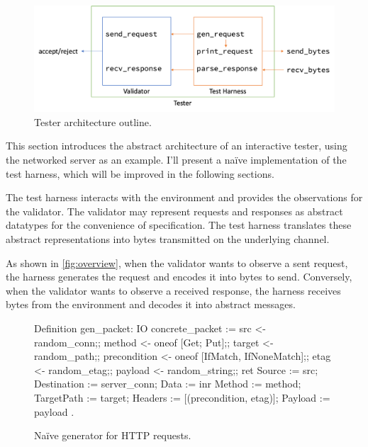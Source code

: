 \begin{figure}
  \centering
  \includegraphics[width=.9\textwidth]{figures/harness-outline}
  \caption{Tester architecture outline.}
  \label{fig:overview}
\end{figure}

This section introduces the abstract architecture of an interactive tester,
using the networked server as an example.  I'll present a na\"ive implementation
of the test harness, which will be improved in the following sections.

The test harness interacts with the environment and provides the observations
for the validator.  The validator may represent requests and responses as
abstract datatypes for the convenience of specification.  The test harness
translates these abstract representations into bytes transmitted on the
underlying channel.

As shown in \autoref{fig:overview}, when the validator wants to observe a sent
request, the harness generates the request and encodes it into bytes to send.
Conversely, when the validator wants to observe a received response, the harness
receives bytes from the environment and decodes it into abstract messages.

\begin{figure}
\begin{coq}
  Definition gen_packet: IO concrete_packet :=
    src          <- random_conn;;
    method       <- oneof [Get; Put];;
    target       <- random_path;;
    precondition <- oneof [IfMatch, IfNoneMatch];;
    etag         <- random_etag;;
    payload      <- random_string;;
    ret { Source      := src;
          Destination := server_conn;
          Data        := inr { Method     := method;
                               TargetPath := target;
                               Headers    := [(precondition, etag)];
                               Payload    := payload
                             }
        }.
\end{coq}
\caption{Na\"ive generator for HTTP requests.}
\label{fig:naive-generator}
\end{figure}

